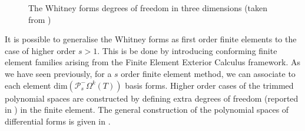 \documentclass{elsarticle}
\begin{document}
\begin{figure}[tbh]%
\centering
{}%
\hspace{8pt}%
%
\hspace{8pt}%
	\hspace{8pt}%
\caption{The Whitney forms degrees of freedom in three dimensions (taken from \cite[Page 91]{arnold2018finite})}%
\label{fig:whitneyforms}%
\end{figure}

It is possible to generalise the Whitney forms as first order finite elements to the case of higher order $s>1$. This is be done by introducing  conforming finite element families arising from the Finite Element Exterior Calculus framework. As we have seen previously, for a $s$ order finite element method, we can associate to each element $\mathrm{dim}( \mathcal{P}^-_s\Omega^k(T))$ basis forms. Higher order cases of the trimmed polynomial spaces are constructed by defining extra degrees of freedom (reported in \cite[Eq. 5.2]{arnold2006acta}) in the finite element. The general construction of the
polynomial spaces of differential forms is given in \cite{arnold2006acta,arnold2018finite}. 
\end{document}
